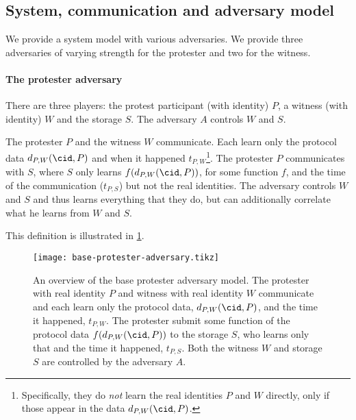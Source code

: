 \subsection{System, communication and adversary model}%
\label{adversary-model}

We provide a system model with various adversaries.
We provide three adversaries of varying strength for the protester and two for 
the witness.

\paragraph{The protester adversary}

There are three players: the protest participant (with identity) \(P\), a 
witness (with identity) \(W\) and the storage \(S\).
The adversary \(A\) controls \(W\) and \(S\).

\begin{definition}\label{base-protester-adversary}
  The protester \(P\) and the witness \(W\) communicate.
  Each learn only the protocol data \(d_{P,W}(\cid, P)\) and when it happened 
  \(t_{P,W}\)\footnote{%
    Specifically, they do \emph{not} learn the real identities \(P\) and \(W\) 
    directly, only if those appear in the data \(d_{P,W}(\cid, P)\).
  }.
  The protester \(P\) communicates with \(S\), where \(S\) only learns 
  \(f(d_{P,W}(\cid, P))\), for some function \(f\), and the time of the 
  communication (\(t_{P,S}\)) but not the real identities.
  The adversary controls \(W\) and \(S\) and thus learns everything that they 
  do, but can additionally correlate what he learns from \(W\) and \(S\).
\end{definition}

This definition is illustrated in \cref{fig:protester-adversary}.

\begin{figure}
  \centering
  \texttt{[image: base-protester-adversary.tikz]}
  \caption{\label{fig:protester-adversary}%
    An overview of the base protester adversary model.
    The protester with real identity \(P\) and witness with real identity \(W\) 
    communicate and each learn only the protocol data, \(d_{P,W}(\cid, P)\), 
    and the time it happened, \(t_{P,W}\).
    The protester submit some function of the protocol data \(f(d_{P,W}(\cid, 
      P))\) to the storage \(S\), who learns only that and the time it 
    happened, \(t_{P,S}\).
    Both the witness \(W\) and storage \(S\) are controlled by the adversary 
    \(A\).
  }
\end{figure}

